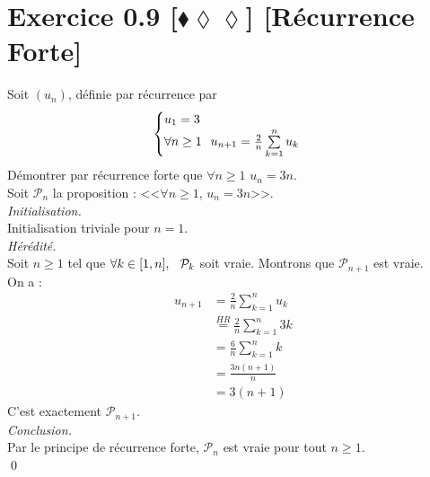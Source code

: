 \documentclass[10pt]{article}
\begin{document}
\section*{Exercice 0.9 [$\blacklozenge\lozenge\lozenge$] [Récurrence Forte]}
\begin{tcolorbox}[enhanced, width=7in, center, size=fbox, fontupper=\large, drop shadow southwest]
    Soit $(u_n)$, définie par récurrence par
    \begin{equation*}
        \begin{cases}
            u_1 = 3\\
            \forall{n\geq1} \hspace{0.25cm} u_{n+1}= \frac{2}{n}\sum\limits^{n}_{k=1}{u_k}
        \end{cases}
    \end{equation*}
    Démontrer par récurrence forte que $\forall{n\geq1}$ $u_n=3n$.\\
    Soit $\mathcal{P}_n$ la proposition : <<$\forall{n\geq1}$, $u_n=3n$>>.\\
    \emph{Initialisation.}\\
    Initialisation triviale pour $n=1$.\\
    \emph{Hérédité.}\\
    Soit $n\geq1$ tel que $\forall k\in[1,n], \hspace{0.25cm} \mathcal{P}_k$ soit vraie. Montrons que $\mathcal{P}_{n+1}$ est vraie.\\
    On a :
    \begin{align*}
        u_{n+1} 
        &= \frac{2}{n}\sum^{n}_{k=1}{u_k}\\
        &\stackrel{HR}{=} \frac{2}{n}\sum^{n}_{k=1}{3k}\\
        &= \frac{6}{n}\sum^{n}_{k=1}{k}\\
        &= \frac{3n(n+1)}{n}\\
        &= 3(n+1)
    \end{align*}
    C'est exactement $\mathcal{P}_{n+1}$.\\
    \emph{Conclusion.}\\
    Par le principe de récurrence forte, $\mathcal{P}_n$ est vraie pour tout $n\geq1$.\\
    \qed
\end{tcolorbox}
\end{document}
